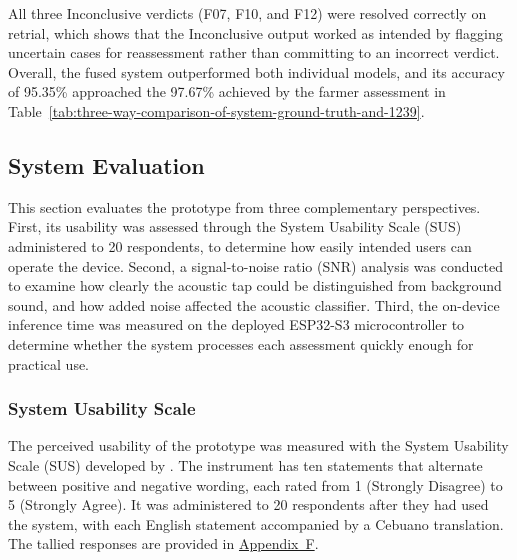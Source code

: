 \begin{thesisprose}
All three Inconclusive verdicts (F07, F10, and F12) were resolved correctly on retrial, which shows that the Inconclusive output worked as intended by flagging uncertain cases for reassessment rather than committing to an incorrect verdict. Overall, the fused system outperformed both individual models, and its accuracy of 95.35\% approached the 97.67\% achieved by the farmer assessment in Table~\ref{tab:three-way-comparison-of-system-ground-truth-and-1239}.

\subsection{System Evaluation}

This section evaluates the prototype from three complementary perspectives. First, its usability was assessed through the System Usability Scale (SUS) administered to 20 respondents, to determine how easily intended users can operate the device. Second, a signal-to-noise ratio (SNR) analysis was conducted to examine how clearly the acoustic tap could be distinguished from background sound, and how added noise affected the acoustic classifier. Third, the on-device inference time was measured on the deployed ESP32-S3 microcontroller to determine whether the system processes each assessment quickly enough for practical use.

\subsubsection{System Usability Scale}

The perceived usability of the prototype was measured with the System Usability Scale (SUS) developed by \citet{brooke1996}. The instrument has ten statements that alternate between positive and negative wording, each rated from 1 (Strongly Disagree) to 5 (Strongly Agree). It was administered to 20 respondents after they had used the system, with each English statement accompanied by a Cebuano translation. The tallied responses are provided in \hyperref[app:section-F]{Appendix~F}.


\end{thesisprose}
